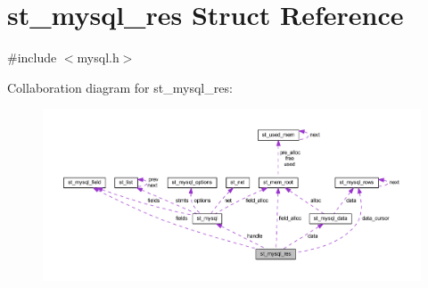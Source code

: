 \hypertarget{structst__mysql__res}{}\section{st\+\_\+mysql\+\_\+res Struct Reference}
\label{structst__mysql__res}


{\ttfamily \#include $<$mysql.\+h$>$}



Collaboration diagram for st\+\_\+mysql\+\_\+res\+:\nopagebreak
\begin{figure}[H]
\begin{center}
\leavevmode
\includegraphics[width=350pt]{structst__mysql__res__coll__graph}
\end{center}
\end{figure}
